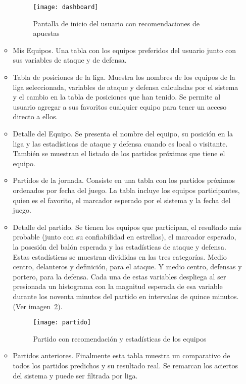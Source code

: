 \begin{itemize}
\begin{itemize}
				\begin{figure}[!htb]\centering
				   \begin {minipage}{0.9\textwidth}
				     \texttt{[image: dashboard]}
				     \caption{Pantalla de inicio del usuario con recomendaciones de apuestas}\label{fig:dashboard}
				   \end{minipage}
				\end{figure}
				\item Mis Equipos. Una tabla con los equipos preferidos del usuario junto con sus variables de ataque y de defensa.
				\item Tabla de posiciones de la liga. Muestra los nombres de los equipos de la liga seleccionada, variables de ataque y defensa calculadas por el sistema  y el cambio en la tabla de posiciones que han tenido. Se permite al usuario agregar a sus favoritos cualquier equipo para tener un acceso directo a ellos.
				\item Detalle del Equipo. Se presenta el nombre del equipo, su posición en la liga y las estadísticas de ataque y defensa cuando es local o visitante. También se muestran el listado de los partidos próximos que tiene el equipo.
				\item Partidos de la jornada. Consiste en una tabla con los partidos próximos ordenados por fecha del juego. La tabla incluye los equipos participantes, quien es el favorito, el marcador esperado por el sistema y la fecha del juego.
				\item Detalle del partido. Se tienen los equipos que participan, el resultado más probable (junto con su confiabilidad en estrellas), el marcador esperado, la posesión del balón esperada y las estadísticas de ataque y defensa. Estas estadísticas se muestran divididas en las tres categorías. Medio centro, delanteros y definición, para el ataque. Y medio centro, defensas y portero, para la defensa. Cada una de estas variables despliega al ser presionada un histograma con la magnitud esperada de esa variable durante los noventa minutos del partido en intervalos de quince minutos. (Ver imagen~\ref{Fig:partido}).
				\begin{figure}[!htb]\centering
				   \begin {minipage}{0.8\textwidth}
				     \texttt{[image: partido]}
				     \caption{Partido con recomendación y estadísticas de los equipos}\label{Fig:partido}
				   \end{minipage}
				\end{figure}

				\item Partidos anteriores. Finalmente esta tabla muestra un comparativo de todos los partidos predichos y su resultado real. Se remarcan los aciertos del sistema y puede ser filtrada por liga.

			\end{itemize}

		\end{itemize}


